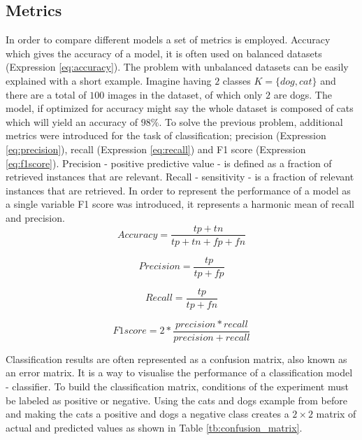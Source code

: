 \documentclass[times, utf8, diplomski]{fer}
\begin{document}
\subsection{Metrics}
\label{se:metrics}
In order to compare different models a set of metrics is employed. Accuracy which gives the accuracy of a model, it is often used on balanced datasets (Expression \ref{eq:accuracy}). The problem with unbalanced datasets can be easily explained with a short example. Imagine having $2$ classes $K=\{dog,cat\}$ and there are a total of $100$ images in the dataset, of which only $2$ are dogs. The model, if optimized for accuracy might say the whole dataset is composed of cats which will yield an accuracy of $98\%$. To solve the previous problem, additional metrics were introduced for the task of classification; precision (Expression \ref{eq:precision}), recall (Expression \ref{eq:recall}) and F1 score (Expression \ref{eq:f1score}). Precision - positive predictive value - is defined as a fraction of retrieved instances that are relevant. Recall - sensitivity - is a fraction of relevant instances that are retrieved. In order to represent the performance of a model as a single variable F1 score was introduced, it represents a harmonic mean of recall and precision.
\begin{equation} \label{eq:accuracy}
    Accuracy = \frac{tp + tn}{tp + tn + fp + fn}
\end{equation}

\begin{equation} \label{eq:precision}
    Precision = \frac{tp}{tp + fp}
\end{equation}

\begin{equation} \label{eq:recall}
    Recall = \frac{tp}{tp + fn}
\end{equation}

\begin{equation} \label{eq:f1score}
    F1 score = 2 * \frac{precision * recall}{precision + recall}
\end{equation}



Classification results are often represented as a confusion matrix, also known as an error matrix.  It is a  way to visualise the performance of a classification model - classifier. To build the classification matrix, conditions of the experiment must be labeled as positive or negative. Using the cats and dogs example from before and making the cats a positive and dogs a negative class creates a $2 \times 2$ matrix of actual and predicted values as shown in Table \ref{tb:confusion_matrix}.
\end{document}
